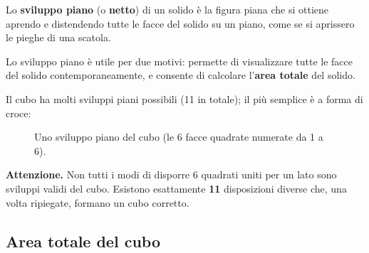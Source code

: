 \begin{definizione}
    Lo \textbf{sviluppo piano} (o \textbf{netto}) di un solido è la figura piana che si ottiene aprendo e distendendo tutte le facce del solido su un piano, come se si aprissero le pieghe di una scatola.
\end{definizione}

Lo sviluppo piano è utile per due motivi: permette di visualizzare tutte le facce del solido contemporaneamente, e consente di calcolare l'\textbf{area totale} del solido.

Il cubo ha molti sviluppi piani possibili (11 in totale); il più semplice è a forma di croce:

\begin{figure}[htb]
    \centering
    \caption{Uno sviluppo piano del cubo (le 6 facce quadrate numerate da 1 a 6).}
\end{figure}

\begin{attenzione}
    \textbf{Attenzione.} Non tutti i modi di disporre 6 quadrati uniti per un lato sono sviluppi validi del cubo. Esistono esattamente \textbf{11} disposizioni diverse che, una volta ripiegate, formano un cubo corretto.
\end{attenzione}

\subsection{Area totale del cubo}

